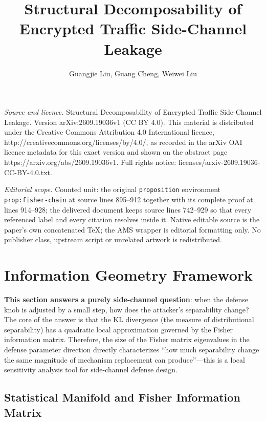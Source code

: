 \documentclass[10pt,a4paper]{amsart}
\begin{document}
\title[Structural Decomposability of Encrypted Traffic Side-Channel]{Structural Decomposability of Encrypted Traffic Side-Channel Leakage}
\author{Guangjie Liu, Guang Cheng, Weiwei Liu}
\date{}
\maketitle
\noindent\emph{Source and licence.} Structural Decomposability of Encrypted Traffic Side-Channel Leakage. Version arXiv:2609.19036v1 (CC BY 4.0). This material is distributed under the Creative Commons Attribution 4.0 International licence, http://creativecommons.org/licenses/by/4.0/, as recorded in the arXiv OAI licence metadata for this exact version and shown on the abstract page https://arxiv.org/abs/2609.19036v1. Full rights notice: licenses/arxiv-2609.19036-CC-BY-4.0.txt.\par\smallskip
\noindent\textit{Editorial scope.} Counted unit: the original \texttt{proposition} environment \texttt{prop:fisher-chain} at source lines 895--912 together with its complete proof at lines 914--928; the delivered document keeps source lines 742--929 so that every referenced label and every citation resolves inside it. Native editable source is the paper's own concatenated TeX; the AMS wrapper is editorial formatting only. No publisher class, upstream script or unrelated artwork is redistributed.
\section{Information Geometry Framework}\label{sec:ig}

\textbf{This section answers a purely side-channel question}: when the
defense knob is adjusted by a small step, how does the attacker's
separability change?
The core of the answer is that the KL divergence (the measure of
distributional separability) has a quadratic local approximation governed
by the Fisher information matrix.
Therefore, the size of the Fisher matrix eigenvalues in the defense
parameter direction directly characterizes ``how much separability change
the same magnitude of mechanism replacement can produce''---this is a
local sensitivity analysis tool for side-channel defense design.

\subsection{Statistical Manifold and Fisher Information Matrix}
\end{document}
